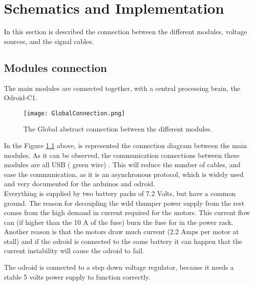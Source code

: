 %
%   
%

\chapter{Schematics and Implementation}

In this section is described the connection between the different modules, voltage sources, and the signal cables.

\section{Modules connection}

The main modules are connected together, with a central processing brain, the Odroid-C1.

\begin{figure}[H]
  \centering
  \texttt{[image: GlobalConnection.png]}
  \caption{The Global abstract connection between the different modules.}
\label{fig:GlobalConnection}
\end{figure}

In the Figure \ref{fig:GlobalConnection} above, is represented the connection diagram between the main modules. As it can be observed, the communication connections between these modules are all USB ( green wire) . This will reduce the number of cables, and ease the communication, as it is an asynchronous protocol, which is widely used and very documented for the arduinos and odroid.\\

Everything is supplied by two battery packs of 7.2 Volts, but have a common ground. The reason for decoupling the wild thumper power supply from the rest comes from the high demand in current required for the motors. This current flow can (if higher than the 10 A of the fuse) burn the fuse for in the power rack. Another reason is that the motors draw much current (2.2 Amps per motor at stall) and if the odroid is connected to the same battery it can happen that the current instability will cause the odroid to fail.

The odroid is connected to a step down voltage regulator, because it needs a stable 5 volts power supply to function correctly.

